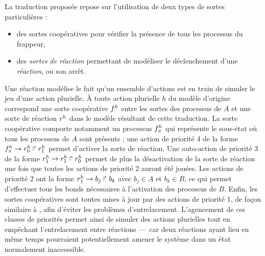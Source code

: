 La traduction proposée repose sur l'utilisation de deux types de sortes particulières :
\begin{itemize}
  \item des sortes coopératives pour vérifier la présence de tous les processus du frappeur,
  \item des \emph{sortes de réaction} permettant de modéliser le déclenchement d'une \emph{réaction},
    ou son arrêt.
\end{itemize}
Une réaction modélise le fait qu'un ensemble d'actions est en train
de simuler le jeu d'une action plurielle.
À toute action plurielle $h$ du modèle d'origine correspond une sorte coopérative $f^{h}$
entre les sortes des processus de $A$
et une sorte de réaction $r^{h}$ dans le modèle résultant de cette traduction.
La sorte coopérative comporte notamment un processus $f^{h}_\pi$ qui représente le sous-état
où tous les processus de $A$ sont présents ; une action de priorité 4 de la forme
$f^{h}_\pi\rightarrow r^{h}_0\Rsh r^{h}_1$ permet d'activer la sorte de réaction.
Une auto-action de priorité 3 de la forme $r^{h}_1\rightarrow r^{h}_1\Rsh r^{h}_0$
permet de plus la désactivation de la sorte de réaction
une fois que toutes les actions de priorité 2 auront été jouées.
Les actions de priorité 2 ont la forme $r^{h}_1\rightarrow b_j\Rsh b_k$
avec $b_j \in A$ et $b_k \in B$,
ce qui permet d'effectuer tous les bonds nécessaires à l'activation des processus de $B$.
Enfin, les sortes coopératives sont toutes mises à jour par des actions de priorité 1,
de façon similaire à , afin d'éviter les problèmes d'entrelacement.
L'agencement de ces classes de priorités permet ainsi de simuler des actions plurielles
tout en empêchant l'entrelacement entre réactions
---~car deux réactions ayant lieu en même temps pourraient potentiellement
amener le système dans un état normalement inaccessible.

